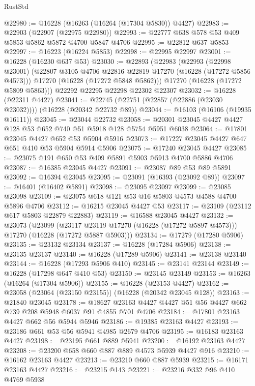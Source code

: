 \begin{lexlean}{RustStd}
\begin{coremodule}
@22980 := @16228 (@16263 (@16264 (@17304 @5830)) @4427)
@22983 := @22903 (@22907 (@22975 @22980))
@22993 := @22777 @638 @578 @53 @409 @5853 @5862 @5872 @4700 @5847 @4706
@22995 := @22812 @637 @5853
@22997 := @16223 (@16224 @5853)
@22998 := @22995 @22997
@23001 := @16228 (@16230 @637 @53)
@23030 := @22893
    (@22983
      (@22993
        (@22998 @23001)
        (@22807 @3105 @4706 @22816 @22819 @17270 (@16228 (@17272 @5856 @4573)))
        @17270
        (@16228 (@17272 @5848 @5862)))
      @17270
      (@16228 (@17272 @5809 @5863)))
    @22292
    @22295
    @22298
    @22302
    @22307
@23032 := @16228 (@22311 @4427)
@23041 := @22745 (@22751 (@22857 (@22886 (@23030 @23032)))) (@16228 (@20342 @22732 @89))
@23044 := @16103 (@16106 (@19935 @16111))
@23045 := @23044 @22732
@23058 := @20301 @23045 @4427 @4427 @128 @53 @652 @740 @51 @5918 @128 @5754 @5951 @6038
@23064 := @17801 @23045 @4427 @652 @53 @5904 @5916
@23073 := @17227 @23045 @4427 @647 @651 @410 @53 @5904 @5914 @5906
@23075 := @17240 @23045 @4427
@23085 := @23075 @191 @650 @53 @409 @5891 @5903 @5913 @4700 @5886 @4706
@23087 := @16385 @23045 @4427
@23091 := @23087 @89 @53 @89 @5891
@23092 := @16394 @23045
@23095 := @23091 (@16393 (@23092 @89))
@23097 := @16401 (@16402 @5891)
@23098 := @23095 @23097
@23099 := @23085 @23098
@23109 := @23075 @618 @121 @53 @16 @5803 @4573 @4588 @4700 @5896 @4706
@23112 := @16215 @23045 @4427 @53
@23117 := @23109 (@23112 @617 @5803 @22879 @22883)
@23119 := @16588 @23045 @4427
@23132 := @23073
    (@23099
      (@23117 @23119 @17270 (@16228 (@17272 @5897 @4573)))
      @17270
      (@16228 (@17272 @5887 @5903)))
@23134 := @17279 (@17280 @5906)
@23135 := @23132 @23134
@23137 := @16228 (@17284 @5906)
@23138 := @23135 @23137
@23140 := @16228 (@17289 @5906)
@23141 := @23138 @23140
@23144 := @16228 (@17293 @5906 @410)
@23145 := @23141 @23144
@23149 := @16228 (@17298 @647 @410 @53)
@23150 := @23145 @23149
@23153 := @16263 (@16264 (@17304 @5906))
@23155 := @16228 (@23153 @4427)
@23162 := @23058 (@23064 (@23150 @23155)) (@16228 (@20342 @23045 @128))
@23163 := @21840 @23045
@23178 := @18627 @23163 @4427 @4427 @51 @56 @4427 @662 @739 @208 @5948 @6037 @91 @4855 @701 @4706
@23184 := @17801 @23163 @4427 @662 @56 @5944 @5946
@23186 := @19385 @23163 @4427
@23193 := @23186 @661 @53 @56 @5941 @4985 @2679 @4706
@23195 := @16183 @23163 @4427
@23198 := @23195 @661 @889 @5941
@23200 := @16192 @23163 @4427
@23208 := @23200 @658 @660 @887 @889 @4573 @5939 @4427 @916
@23210 := @16162 @23163 @4427
@23213 := @23210 @660 @887 @5939
@23215 := @16171 @23163 @4427
@23216 := @23215 @143
@23221 := @23216 @332 @96 @410 @4769 @5938

\end{coremodule}
\end{lexlean}
